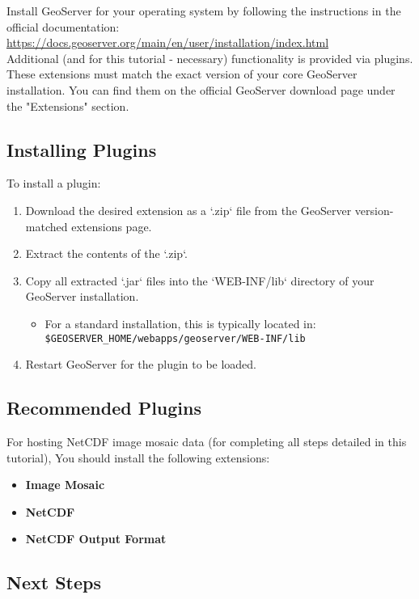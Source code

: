 \documentclass{article}
\begin{document}
Install GeoServer for your operating system by following the instructions in the official documentation:  
\url{https://docs.geoserver.org/main/en/user/installation/index.html} \\

Additional (and for this tutorial - necessary) functionality is provided via plugins. These extensions must match the exact version of your core GeoServer installation. You can find them on the official GeoServer download page under the "Extensions" section.

\subsection*{Installing Plugins}

To install a plugin:

\begin{enumerate}
  \item Download the desired extension as a `.zip` file from the GeoServer version-matched extensions page.
  \item Extract the contents of the `.zip`.
  \item Copy all extracted `.jar` files into the `WEB-INF/lib` directory of your GeoServer installation.
  \begin{itemize}
    \item For a standard installation, this is typically located in:  
    \texttt{\$GEOSERVER\_HOME/webapps/geoserver/WEB-INF/lib}
  \end{itemize}
  \item Restart GeoServer for the plugin to be loaded.
\end{enumerate}

\subsection*{Recommended Plugins}

For hosting NetCDF image mosaic data (for completing all steps detailed in this tutorial), You should install the following extensions:

\begin{itemize}
  \item \textbf{Image Mosaic}
  \item \textbf{NetCDF}
  \item \textbf{NetCDF Output Format}
\end{itemize}


\subsection*{Next Steps}
\end{document}
